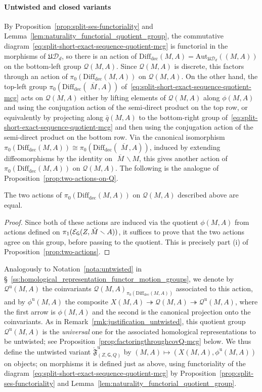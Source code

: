 \documentclass[AHL,Unicode,published]{cedram}
\newcommand{\Aut}{\mathrm{Aut}}
\newcommand{\Int}{\mathring}
\newcommand{\unt}{\mathrm{u}}
\newcommand{\rdec}{\mathrm{dec}}
\newcommand{\mbar}{\ensuremath{{\,\,\overline{\!\! M\!}\,}}}
\newcommand{\fF}{\mathfrak{F}}
\newcommand{\fU}{\ensuremath{\mathfrak{U}}}
\newcommand{\sG}{\mathsf{G}}
\newcommand{\cD}{\mathcal{D}}
\newcommand{\cE}{\mathcal{E}}
\newcommand{\cQ}{\mathcal{Q}}
\newcommand{\diffdec}{\ensuremath{\mathrm{Diff}_{\rdec}}}
\begin{document}
\paragraph*{Untwisted and closed variants}
By Proposition~\ref{prop:split-ses-functoriality} and Lemma~\ref{lem:naturality_functorial_quotient_group}, the commutative diagram~\eqref{eq:split-short-exact-sequence-quotient-mcg} is functorial in the morphisms of $\fU\cD_{d}$, so there is an action of $\diffdec(M,A) = \Aut_{\fU\cD_{d}}((M,A))$ on the bottom-left group $\cQ(M,A)$. Since $\cQ(M,A)$ is discrete, this factors through an action of $\pi_{0}(\diffdec(M,A))$ on $\cQ(M,A)$. On the other hand, the top-left group $\pi_{0}(\diffdec(\mbar,A))$ of~\eqref{eq:split-short-exact-sequence-quotient-mcg} acts on $\cQ(M,A)$ either by lifting elements of $\cQ(M,A)$ along $\phi(M,A)$ and using the conjugation action of the semi-direct product on the top row, or equivalently by projecting along $\bar{q}(M,A)$ to the bottom-right group of~\eqref{eq:split-short-exact-sequence-quotient-mcg} and then using the conjugation action of the semi-direct product on the bottom row. Via the canonical isomorphism $\pi_{0}(\diffdec(M,A)) \cong \pi_{0}(\diffdec(\mbar,A))$, induced by extending diffeomorphisms by the identity on $\mbar \smallsetminus M$, this gives another action of $\pi_{0}(\diffdec(M,A))$ on $\cQ(M,A)$. The following is the analogue of Proposition~\ref{prop:two-actions-on-Q}.

\begin{prop}\label{prop:two-actions-on-Q-mcg}
The two actions of $\pi_{0}(\diffdec(M,A))$ on $\cQ(M,A)$ described above are equal.
\end{prop}


\begin{proof}
Since both of these actions are induced via the quotient $\phi(M,A)$ from actions defined on $\pi_{1}(\cE_{\sG}(Z,\Breve{M}\smallsetminus A))$, it suffices to prove that the two actions agree on this group, before passing to the quotient. This is precisely part (i) of Proposition~\ref{prop:two-actions}.
\end{proof}

Analogously to Notation~\ref{nota:untwisted} in \S~\ref{ss:homological_representation_functor_motion_groups}, we denote by $\cQ^{\unt}(M,A)$ the coinvariants $\cQ(M,A)_{\pi_{0}(\diffdec(M,A))}$ associated to this action, and by $\phi^{\unt}(M,A)$ the composite $X(M,A) \twoheadrightarrow \cQ(M,A) \twoheadrightarrow \cQ^{\unt}(M,A)$, where the first arrow is $\phi(M,A)$ and the second is the canonical projection onto the coinvariants. As in Remark~\ref{rmk:justification_untwisted}, this quotient group $\cQ^{\unt}(M,A)$ is the \emph{universal} one for the associated homological representations to be untwisted; see Proposition~\ref{prop:factoringthroughcovQ-mcg} below. We thus define the untwisted variant $\Int{\fF}^{\unt}_{(Z,\sG,Q)}$ by $(M,A)\mapsto (X(M,A),\phi^{\unt}(M,A))$ on objects; on morphisms it is defined just as above, using functoriality of the diagram~\eqref{eq:split-short-exact-sequence-quotient-mcg} by Proposition~\ref{prop:split-ses-functoriality} and Lemma~\ref{lem:naturality_functorial_quotient_group}.
\end{document}
